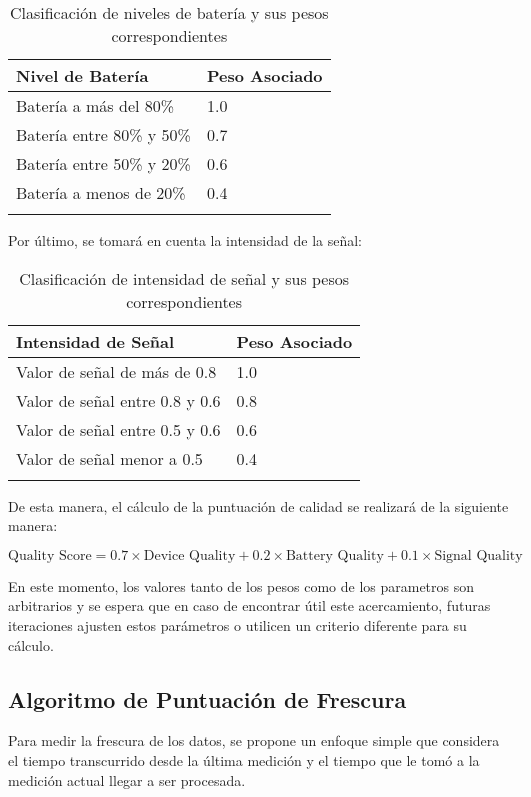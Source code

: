 \begin{longtable}{|p{6cm}|p{3cm}|}
    \hline
    \textbf{Nivel de Batería} & \textbf{Peso Asociado} \\
    \hline
    \endhead
    Batería a más del 80\% & 1.0 \\
    \hline
    Batería entre 80\% y 50\% & 0.7 \\
    \hline
    Batería entre 50\% y 20\% & 0.6 \\
    \hline
    Batería a menos de 20\% & 0.4 \\
    \hline
    \caption{Clasificación de niveles de batería y sus pesos correspondientes}
    \label{tab:bateria}
\end{longtable}

Por último, se tomará en cuenta la intensidad de la señal:
\begin{longtable}{|p{6cm}|p{3cm}|}
    \hline
    \textbf{Intensidad de Señal} & \textbf{Peso Asociado} \\
    \hline
    \endhead
    Valor de señal de más de 0.8 & 1.0 \\
    \hline
    Valor de señal entre 0.8 y 0.6 & 0.8 \\
    \hline
    Valor de señal entre 0.5 y 0.6 & 0.6 \\
    \hline
    Valor de señal menor a 0.5 & 0.4 \\
    \hline
    \caption{Clasificación de intensidad de señal y sus pesos correspondientes}
    \label{tab:senal}
\end{longtable}

\newpage
De esta manera, el cálculo de la puntuación de calidad se realizará de la siguiente manera:


\begin{equation}
    \text{Quality Score} = 0.7 \times \text{Device Quality} + 0.2 \times \text{Battery Quality} + 0.1 \times \text{Signal Quality}
\end{equation}


En este momento, los valores tanto de los pesos como de los parametros son arbitrarios y se espera que en caso de encontrar útil este acercamiento, 
futuras iteraciones ajusten estos parámetros o utilicen un criterio diferente para su cálculo.

\subsection{Algoritmo de Puntuación de Frescura}

Para medir la frescura de los datos, se propone un enfoque simple que considera el tiempo transcurrido desde la última medición 
y el tiempo que le tomó a la medición actual llegar a ser procesada.

